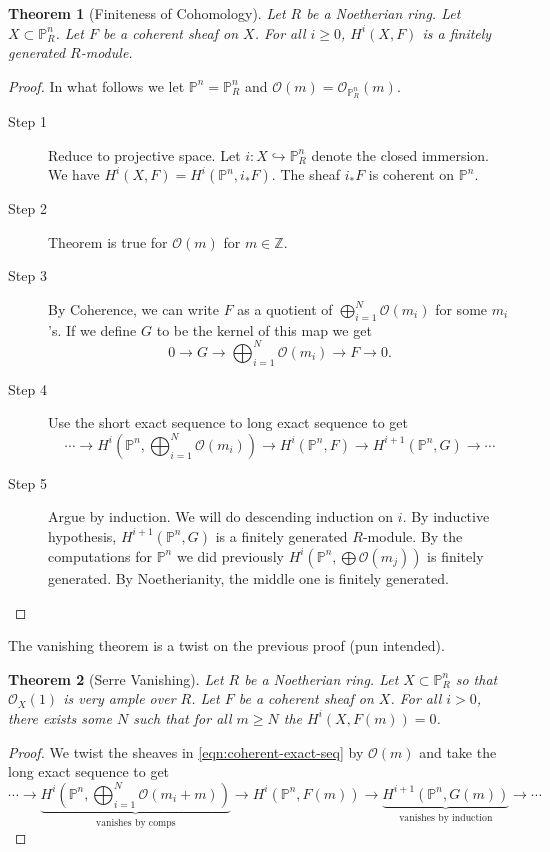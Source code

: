\documentclass[12pt]{article}
\numberwithin{equation}{section}
\newtheorem{theorem}{Theorem}[subsection]
\theoremstyle{definition}
\theoremstyle{remark}
\newcommand{\ZZ}{\mathbb{Z}}
\newcommand{\Ocal}{\mathcal{O}}
\newcommand{\PP}{\mathbb{P}}
\begin{document}
\begin{theorem}[Finiteness of Cohomology]
	Let $R$ be a Noetherian ring.
	Let $X \subset \PP^n_R$. 
	Let $F$ be a coherent sheaf on $X$. 
	For all $i\geq 0$, $H^i(X,F)$ is a finitely generated $R$-module.
\end{theorem}
\begin{proof}
	In what follows we let $\PP^n=\PP^n_R$ and $\Ocal(m) = \Ocal_{\PP^n_R}(m)$.
	\begin{description}
		\item[Step 1] Reduce to projective space. Let $i:X \hookrightarrow \PP^n_R$ denote the closed immersion. We have $H^i(X,F)=H^i(\PP^n,i_*F)$.
		The sheaf $i_*F$ is coherent on $\PP^n$.
		\item[Step 2] Theorem is true for $\Ocal(m)$ for $m\in \ZZ$. 
		\item[Step 3] By Coherence, we can write $F$ as a quotient of $\bigoplus_{i=1}^N\Ocal(m_i)$ for some $m_i$'s. If we define $G$ to be the kernel of this map we get 
		\begin{equation}\label{eqn:coherent-exact-seq}
		0 \to G \to \bigoplus_{i=1}^N \Ocal(m_i) \to F \to 0.
		\end{equation}
		\item[Step 4] Use the short exact sequence to long exact sequence to get 
		$$\cdots \to  H^i(\PP^n, \bigoplus_{i=1}^N \Ocal(m_i) ) \to H^i(\PP^n,F) \to H^{i+1}(\PP^n,G) \to \cdots $$
		\item[Step 5] Argue by induction. 
		We will do descending induction on $i$. 
		By inductive hypothesis, $H^{i+1}(\PP^n,G)$ is a finitely generated $R$-module.
		By the computations for $\PP^n$ we did previously $H^i(\PP^n, \bigoplus \Ocal(m_j))$ is finitely generated. 
		By Noetherianity, the middle one is finitely generated.
	\end{description}
\end{proof}
The vanishing theorem is a twist on the previous proof (pun intended). 
\begin{theorem}[Serre Vanishing]
	Let $R$ be a Noetherian ring.
	Let $X \subset \PP^n_R$ so that $\Ocal_X(1)$ is very ample over $R$. 
	Let $F$ be a coherent sheaf on $X$. 
	For all $i> 0$, there exists some $N$ such that for all $m\geq N$ the $H^i(X,F(m))=0$.
\end{theorem}
\begin{proof}
	We twist the sheaves in \eqref{eqn:coherent-exact-seq} by $\Ocal(m)$ and take the long exact sequence to get
	$$\cdots \to  \underbrace{H^i(\PP^n, \bigoplus_{i=1}^N \Ocal(m_i+m) )}_{\mbox{vanishes by comps}} \to H^i(\PP^n,F(m)) \to \underbrace{H^{i+1}(\PP^n,G(m))}_{\mbox{vanishes by induction}} \to \cdots $$
\end{proof}
\end{document}

